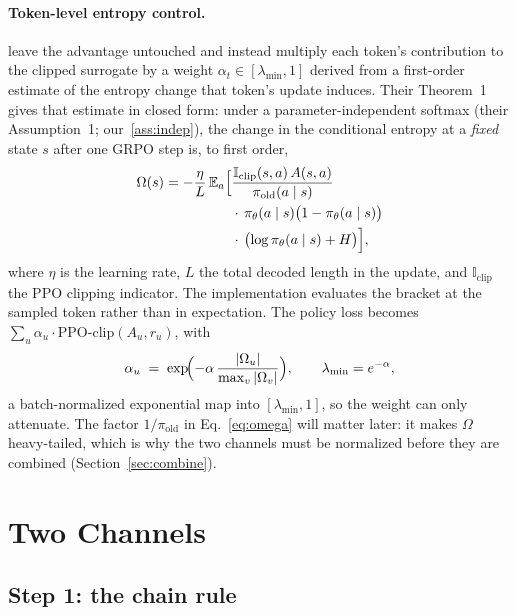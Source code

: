 \documentclass[11pt]{article}
\newcommand{\Om}{\Omega}
\newcommand{\E}{\mathbb{E}}
\newcommand{\pit}{\pi_{\theta}}
\begin{document}
\paragraph{Token-level entropy control.}
\citet{steer} leave the advantage untouched and instead multiply each token's
contribution to the clipped surrogate by a weight
$\alpha_t \in [\lambda_{\min}, 1]$ derived from a first-order estimate of the
entropy change that token's update induces. Their Theorem~1 gives that estimate in
closed form: under a parameter-independent softmax
(their Assumption~1; our~\ref{ass:indep}), the change in the conditional entropy at
a \emph{fixed} state $s$ after one GRPO step is, to first order,
%
\begin{equation}
\begin{split}
\Om(s) = -\frac{\eta}{L}\, \E_{a}\Bigl[
  &\frac{\mathbb{I}_{\mathrm{clip}}(s,a)\, A(s,a)}{\pi_{\mathrm{old}}(a \mid s)}\\
  &\cdot\, \pit(a \mid s)\bigl(1 - \pit(a \mid s)\bigr)\\
  &\cdot\, \bigl(\log \pit(a \mid s) + H\bigr)\Bigr],
\end{split}
\label{eq:omega}
\end{equation}
%
where $\eta$ is the learning rate, $L$ the total decoded length in the update, and
$\mathbb{I}_{\mathrm{clip}}$ the PPO clipping indicator. The implementation
evaluates the bracket at the sampled token rather than in expectation. The policy
loss becomes $\sum_u \alpha_u \cdot \mathrm{PPO\text{-}clip}(A_u, r_u)$, with
%
\begin{equation}
\alpha_u \;=\; \exp\!\Bigl(-\alpha\, \frac{|\Om_u|}{\max_v |\Om_v|}\Bigr),
\qquad \lambda_{\min} = e^{-\alpha},
\label{eq:steermap}
\end{equation}
%
a batch-normalized exponential map into $[\lambda_{\min}, 1]$, so the weight can
only attenuate. The factor $1/\pi_{\mathrm{old}}$ in Eq.~\eqref{eq:omega} will
matter later: it makes $\Om$ heavy-tailed, which is why the two channels must be
normalized before they are combined (Section~\ref{sec:combine}).

\section{Two Channels}
\label{sec:channels}

\subsection{Step 1: the chain rule}
\end{document}

